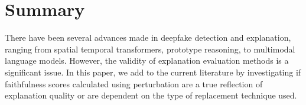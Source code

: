 \documentclass[12pt,a4wide]{report}
\theoremstyle{plain}
\theoremstyle{definition}
\theoremstyle{remark}
\begin{document}
\section{Summary}
\label{summary}

There have been several advances made in deepfake detection and explanation, ranging from spatial temporal transformers, prototype reasoning, to multimodal language models. However, the validity of explanation evaluation methods is a significant issue.
In this paper, we add to the current literature by investigating if faithfulness scores calculated using perturbation are a true reflection of explanation quality or are dependent on the type of replacement technique used.














\nocite{*}

\printbibliography[notcategory=furtherreading, title={References}, heading=bibintoc]

\printbibliography[category=furtherreading, title={Bibliography}, heading=bibintoc]
\end{document}
